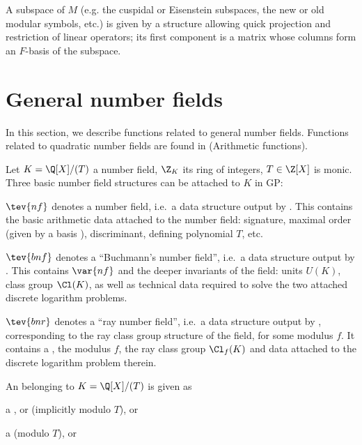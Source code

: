A subspace of $M$ (e.g. the cuspidal or Eisenstein subspaces, the new or
old modular symbols, etc.) is given by a structure allowing quick projection
and restriction of linear operators; its first component is a matrix whose
columns  form  an $F$-basis  of the subspace.


\section{General number fields}

In this section, we describe functions related to general number fields.
Functions related to quadratic number fields are found in
 (Arithmetic functions).


Let $K = \Q[X] / (T)$ a number field, $\Z_K$ its ring of integers, $T\in\Z[X]$
is monic. Three basic number field structures can be attached to $K$ in
GP:

\item $\tev{nf}$ denotes a number field, i.e.~a data structure output by
. This contains the basic arithmetic data attached to the
number field: signature, maximal order (given by a basis ),
discriminant, defining polynomial $T$, etc.

\item $\tev{bnf}$ denotes a ``Buchmann's number field'', i.e.~a
data structure output by . This contains
$\var{nf}$ and the deeper invariants of the field: units $U(K)$, class group
$\Cl(K)$, as well as technical data required to solve the two attached
discrete logarithm problems.

\item $\tev{bnr}$ denotes a ``ray number field'', i.e.~a data structure
output by , corresponding to the ray class group structure of
the field, for some modulus $f$. It contains a , the modulus
$f$, the ray class group $\Cl_f(K)$ and data attached to
the discrete logarithm problem therein.


\noindent An  belonging to $K = \Q[X]/(T)$ is given as

\item a ,  or  (implicitly modulo $T$), or

\item a  (modulo $T$), or

